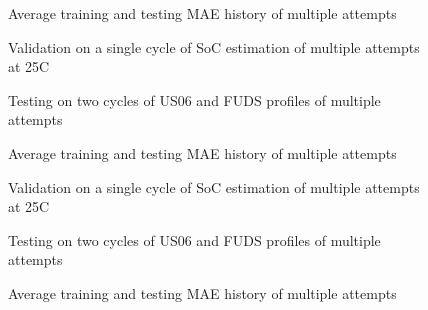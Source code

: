 \begin{figure*}[htbp]
    \centering
    \begin{subfigure}[b]{0.325\textwidth}
        \centering
        
        \caption{Average training and testing MAE history of multiple attempts}
    \end{subfigure}
    \hfill
    \begin{subfigure}[b]{0.325\textwidth}
        \centering
        
        \caption{Validation on a single cycle of SoC estimation of multiple attempts at 25\textdegree{}C}
    \end{subfigure}
    \hfill
    \begin{subfigure}[b]{0.325\textwidth}
        \centering
        
        \caption{Testing on two cycles of US06 and FUDS profiles of multiple attempts}
        \label{subfig:Model-2res-DSTvsFUDS}
    \end{subfigure}
    \begin{subfigure}[b]{0.325\textwidth}
        \centering
        
        \caption{Average training and testing MAE history of multiple attempts}
    \end{subfigure}
    \hfill
    \begin{subfigure}[b]{0.325\textwidth}
        \centering
        
        \caption{Validation on a single cycle of SoC estimation of multiple attempts at 25\textdegree{}C}
    \end{subfigure}
    \hfill
    \begin{subfigure}[b]{0.325\textwidth}
        \centering
        
        \caption{Testing on two cycles of US06 and FUDS profiles of multiple attempts}
    \end{subfigure}
    \begin{subfigure}[b]{0.325\textwidth}
        \centering
        
        \caption{Average training and testing MAE history of multiple attempts}

\end{subfigure}
\end{figure*}

